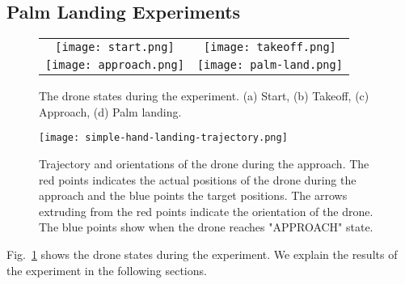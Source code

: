 \subsection{Palm Landing Experiments}
\begin{figure}[b]
    \begin{tabular}{cc}
      \centering
      \begin{minipage}[t]{0.45 \columnwidth}
        \centering
        \texttt{[image: start.png]}
        \subcaption{}
        \label{fig:start}
      \end{minipage}&
      \begin{minipage}[t]{0.45 \columnwidth}
        \centering
        \texttt{[image: takeoff.png]}
        \subcaption{}
        \label{fig:takeoff}
      \end{minipage} \\
      \begin{minipage}[t]{0.45 \columnwidth}
        \centering
        \texttt{[image: approach.png]}
        \subcaption{}
        \label{fig:approach}
      \end{minipage}&
      \begin{minipage}[t]{0.45 \columnwidth}
        \centering
        \texttt{[image: palm-land.png]}
        \subcaption{}
        \label{fig:palm-land}
      \end{minipage}      
    \end{tabular}
    \caption{The drone states during the experiment. (a) Start, (b) Takeoff, (c) Approach, (d) Palm landing.}
    \label{fig:states}
\end{figure}
\begin{figure}[!b]
  \centering
  \texttt{[image: simple-hand-landing-trajectory.png]}
  \caption{Trajectory and orientations of the drone during the approach.
  The red points indicates the actual positions of the drone during the approach and the blue points the target positions. 
  The arrows extruding from the red points indicate the orientation of the drone.
  The blue points show when the drone reaches "APPROACH" state.}
  \label{fig:simple_hand_landing_trajectory}
\end{figure}
Fig.~\ref{fig:states} shows the drone states during the experiment.
We explain the results of the experiment in the following sections.

